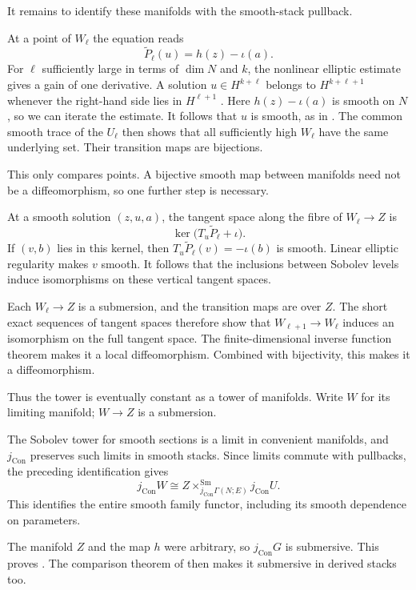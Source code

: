 It remains to identify these manifolds with the smooth-stack pullback.

At a point of $W_\ell$ the equation reads
\[
 \widetilde P_\ell(u)=h(z)-\iota(a).
\]
For $\ell$ sufficiently large in terms of $\dim N$ and $k$, the
nonlinear elliptic estimate gives a gain of one derivative. A solution
$u\in H^{k+\ell}$ belongs to $H^{k+\ell+1}$ whenever the right-hand
side lies in $H^{\ell+1}$ \cite[Theorem~1.2.D]{Taylor_Pseudodifferential_Nonlinear_PDE}.
Here $h(z)-\iota(a)$ is smooth on $N$, so we can iterate the estimate.
It follows that $u$ is smooth, as in
\cite[Lemma~3.4.6]{Steffens_Representability_Elliptic_Moduli}.
The common smooth trace of the $U_\ell$ then shows that all
sufficiently high $W_\ell$ have the same underlying set.
Their transition maps are bijections.

This only compares points. A bijective smooth map between manifolds
need not be a diffeomorphism, so one further step is necessary.

At a smooth solution $(z,u,a)$, the tangent space along the fibre
of $W_\ell\to Z$ is
\[
 \ker\bigl(T_u\widetilde P_\ell+\iota\bigr).
\]
If $(v,b)$ lies in this kernel, then
$T_u\widetilde P_\ell(v)=-\iota(b)$ is smooth.
Linear elliptic regularity makes $v$ smooth.
It follows that the inclusions between Sobolev levels induce
isomorphisms on these vertical tangent spaces.

Each $W_\ell\to Z$ is a submersion, and the transition maps are over $Z$.
The short exact sequences of tangent spaces therefore show that
$W_{\ell+1}\to W_\ell$ induces an isomorphism on the full tangent space.
The finite-dimensional inverse function theorem makes it a local
diffeomorphism. Combined with bijectivity, this makes it a diffeomorphism.

Thus the tower is eventually constant as a tower of manifolds.
Write $W$ for its limiting manifold; $W\to Z$ is a submersion.

The Sobolev tower for smooth sections is a limit in convenient manifolds,
and $j_{\mathrm{Con}}$ preserves such limits in smooth stacks.
Since limits commute with pullbacks, the preceding identification gives
\[
 j_{\mathrm{Con}}W
 \cong Z\times_{j_{\mathrm{Con}}\Gamma(N;E)}^{\mathrm{Sm}}
                 j_{\mathrm{Con}}U.
\]
This identifies the entire smooth family functor, including its
smooth dependence on parameters.

The manifold $Z$ and the map $h$ were arbitrary, so $j_{\mathrm{Con}}G$
is submersive. This proves
. The comparison theorem of
 then makes
it submersive in derived stacks too.

